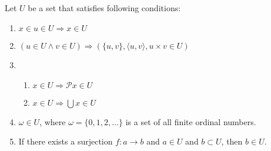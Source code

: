 \documentclass{article}
\begin{document}
\subsubsection{}



\subsubsection{}



\subsubsection{}



\subsubsection{}



\subsubsection{}



\subsubsection{}



\subsubsection{}



\subsection{}

Let $U$ be a set that satisfies following conditions:

\begin{enumerate}[label=(\roman*)]
\item $x \in u \in U \Rightarrow x \in U$
\item $(u \in U \wedge v \in U) \Rightarrow (\{u, v\}, \langle u, v \rangle, u \times v \in U)$
\item \begin{enumerate}[label=(\arabic*)]
\item $x \in U \Rightarrow \mathcal{P} x \in U$
\item $x \in U \Rightarrow \bigcup x \in U$
\end{enumerate}
\item $\omega \in U$, where $\omega = \{0,1,2,\dots\}$ is a set of all finite ordinal numbers.
\item If there exists a surjection $f : a \rightarrow b$ and $a \in U$ and $b \subset U$, then $b \in U$.
\end{enumerate}
\end{document}
